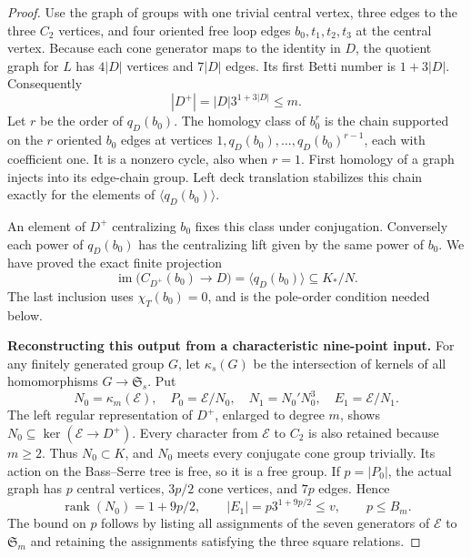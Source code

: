 \begin{proof}
Use the graph of groups with one trivial central vertex,
three edges to the three $C_2$ vertices, and four oriented
free loop edges $b_0,t_1,t_2,t_3$ at the central vertex.
Because each cone generator maps to the identity in $D$,
the quotient graph for $L$ has $4|D|$ vertices and $7|D|$
edges.  Its first Betti number is $1+3|D|$.  Consequently
\[
                   |D^+|=|D|3^{1+3|D|}\leq m.
                                                               \tag{FBO.17}
\]
Let $r$ be the order of $q_D(b_0)$.  The homology class of
$b_0^r$ is the chain supported on the $r$ oriented $b_0$ edges
at vertices $1,q_D(b_0),\ldots,q_D(b_0)^{r-1}$, each with
coefficient one.  It is a nonzero cycle, also when $r=1$.
First homology of a graph injects into its edge-chain group.
Left deck translation stabilizes this chain exactly for the
elements of $\langle q_D(b_0)\rangle$.

An element of $D^+$ centralizing $b_0$ fixes this class under
conjugation.  Conversely each power of $q_D(b_0)$ has the
centralizing lift given by the same power of $b_0$.  We have
proved the exact finite projection
\[
 \operatorname{im}\bigl(C_{D^+}(b_0)\to D\bigr)
                         =\langle q_D(b_0)\rangle
                         \subseteq K_*/N.
                                                               \tag{FBO.18}
\]
The last inclusion uses $\chi_T(b_0)=0$, and is the pole-order
condition needed below.

\par\medskip\noindent\textbf{Reconstructing this output from a characteristic nine-point input.}\quad
For any finitely generated group $G$, let
$\kappa_s(G)$ be the intersection of kernels of all
homomorphisms $G\to\mathfrak S_s$.
Put
\[
 N_0=\kappa_m(\mathcal E),\quad P_0=\mathcal E/N_0,
 \quad N_1=N_0'N_0^3,\quad E_1=\mathcal E/N_1.
                                                               \tag{FBO.19}
\]
The left regular representation of $D^+$, enlarged to degree
$m$, shows $N_0\subseteq\ker(\mathcal E\to D^+)$.
Every character from $\mathcal E$ to $C_2$ is also retained
because $m\geq2$.  Thus $N_0\subset K$, and $N_0$ meets
every conjugate cone group trivially.  Its action on the
Bass--Serre tree is free, so it is a free group.  If
$p=|P_0|$, the actual graph has $p$ central vertices,
$3p/2$ cone vertices, and $7p$ edges.  Hence
\[
 \operatorname{rank}(N_0)=1+9p/2,
 \qquad |E_1|=p3^{1+9p/2}\leq v,
 \qquad p\leq B_m.
                                                               \tag{FBO.20}
\]
The bound on $p$ follows by listing all assignments of the
seven generators of $\mathcal E$ to $\mathfrak S_m$ and
retaining the assignments satisfying the three square relations.


\end{proof}
